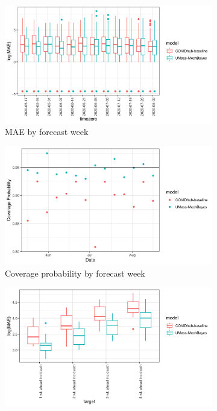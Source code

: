 \documentclass[11pt]{amsart}
\begin{document}
\begin{figure}
  \centering
     \begin{subfigure}{.5\textwidth}
  \centering
    \includegraphics[scale=.135]{mae_results_by_time_zero_inc.png}
    \caption{MAE by forecast week}
\end{subfigure}%
\begin{subfigure}{.5\textwidth}
  \centering
    \includegraphics[scale=.115]{cp_results_by_time_zero.png}
    \caption{Coverage probability by forecast week}
\end{subfigure}
\begin{subfigure}{.5\textwidth}
  \centering
    \includegraphics[scale=.135]{mae_results_by_target_inc.png}

\end{subfigure}
\end{figure}
\end{document}
